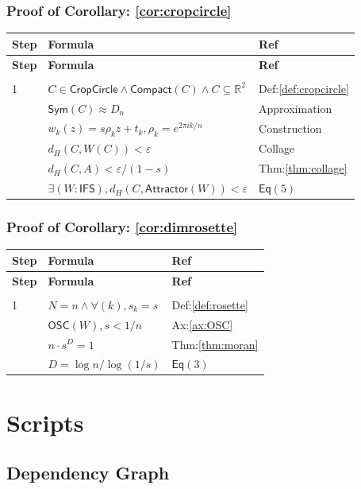 \documentclass[10pt]{amsart}
\newcommand{\br}{,\allowbreak}
\newcommand{\R}{\mathbb{R}}
\newcommand{\Forall}{\forall}
\newcommand{\Exists}{\exists}
\newenvironment{prooftable}{%
	\renewcommand{\arraystretch}{1.2}%
	\setlength{\tabcolsep}{4pt}%
	\setlength{\arrayrulewidth}{0.05pt}
	\fontsize{6}{7.5}\selectfont
	\sloppy
	\begin{longtable}{
			|>{\centering\arraybackslash}m{0.7cm}|
			>{\raggedright\centering\arraybackslash}m{0.70\textwidth}|
			>{\centering\arraybackslash}m{3.5cm}|
		}%
		\hline
		\textbf{Step} & \centering\textbf{Formula} & \textbf{Ref} \\
		\hline
		\endfirsthead
		\hline
		\textbf{Step} & \centering\textbf{Formula} & \textbf{Ref} \\
		\hline
		\endhead
		\hline
		\multicolumn{3}{r}{\textit{Continued on next page}} \\
		\endfoot
		\hline
		\endlastfoot
	}{%
	\end{longtable}%
}
\theoremstyle{break}
\begin{document}
\subsubsection*{Proof of Corollary: \ref{cor:cropcircle}}
\begin{prooftable}
	1 & $C \in \mathsf{CropCircle} \land \mathsf{Compact}(C) \land C \subseteq \R^2$ & Def:\ref{def:cropcircle} \\
	\hline
	2 & $\mathsf{Sym}(C) \approx D_n$ & Approximation \\
	\hline
	3 & $w_k(z) = s \rho_k z + t_k \br \rho_k = e^{2\pi i k/n}$ & Construction \\
	\hline
	4 & $d_H(C \br W(C)) < \varepsilon$ & Collage \\
	\hline
	5 & $d_H(C \br A) < \varepsilon / (1-s)$ & Thm:\ref{thm:collage} \\
	\hline
	6 & $\Exists (W : \mathsf{IFS}) \br d_H(C \br \mathsf{Attractor}(W)) < \varepsilon$ & $\mathsf{Eq}(5)$ \\
\end{prooftable}

\subsubsection*{Proof of Corollary: \ref{cor:dimrosette}}
\begin{prooftable}
	1 & $N = n \land \Forall (k) \br s_k = s$ & Def:\ref{def:rosette} \\
	\hline
	2 & $\mathsf{OSC}(W) \br s < 1/n$ & Ax:\ref{ax:OSC} \\
	\hline
	3 & $n \cdot s^{D} = 1$ & Thm:\ref{thm:moran} \\
	\hline
	4 & $D = \log n / \log(1/s)$ & $\mathsf{Eq}(3)$ \\
\end{prooftable}

\section{Scripts}
\subsection{Dependency Graph}
\end{document}
